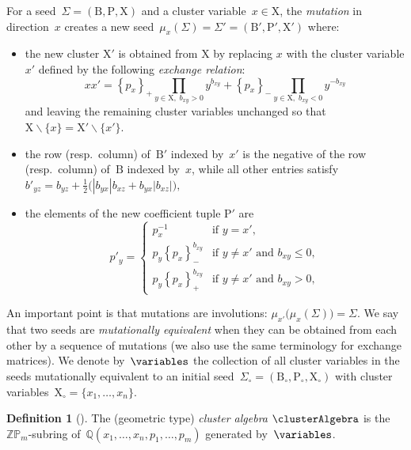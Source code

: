 \documentclass{amsart}
\theoremstyle{definition}
\newtheorem{definition}[theorem]{Definition}
\newcommand{\Q}{\mathbb{Q}} %
\newcommand{\Z}{\mathbb{Z}} %
\newcommand{\ssm}{\smallsetminus} %
\newcommand{\darkblue}{\color{darkblue}} %
\newcommand{\defn}[1]{\textsl{\darkblue #1}} %
\newcommand{\Trop}[1]{\mathbb{P}_{#1}} %
\newcommand{\positiveExponents}[1]{\left\{#1\right\}_+} %
\newcommand{\negativeExponents}[1]{\left\{#1\right\}_-} %
\newcommand{\seed}{\Sigma} %
\newcommand{\cluster}{\mathrm{X}} %
\newcommand{\coefficients}{\mathrm{P}} %
\newcommand{\B}{\mathrm{B}} %
\begin{document}
For a seed~$\seed = (\B, \coefficients, \cluster)$ and a cluster variable~$x \in \cluster$, the \defn{mutation} in direction~$x$ creates a new seed~$\mu_x(\seed) = \seed' = (\B', \coefficients', \cluster')$ where:
\begin{itemize}
\item the new cluster $\cluster'$ is obtained from $\cluster$ by replacing $x$ with the cluster variable $x'$ defined by the following \defn{exchange relation}:
\[
x x' = \positiveExponents{p_x} \prod_{{y \in \cluster, \; b_{xy}  > 0}} y^{b_{xy}} + \negativeExponents{p_x} \prod_{{y \in \cluster, \; b_{xy}  <0}} y^{-b_{xy}}
\]
and leaving the remaining cluster variables unchanged so that $\cluster \ssm \{x\} = \cluster' \ssm \{x'\}$.

\item the row (resp.~column) of~$\B'$ indexed by~$x'$ is the negative of the row (resp.~column) of~$\B$ indexed by~$x$, while all other entries satisfy
\(
b'_{yz} = b_{yz} + \frac{1}{2}\big(|b_{yx}| b_{xz} + b_{yx}|b_{xz}|\big),
\)

\item the elements of the new coefficient tuple $\coefficients'$ are 
\[
p'_y =
\begin{cases}
	p_x^{-1}  & \text{if } y = x', \\
	p_y\negativeExponents{p_x}^{b_{xy}}  & \text{if } y \neq x' \text{ and } b_{xy} \leq 0, \\
	p_y\positiveExponents{p_x}^{b_{xy}}  & \text{if } y \neq x' \text{ and } b_{xy} > 0,
\end{cases}
\]
\end{itemize}
An important point is that mutations are involutions: $\mu_{x'} \big( \mu_{x}(\seed) \big) = \seed$.
We say that two seeds are \defn{mutationally equivalent} when they can be obtained from each other by a sequence of mutations (we also use the same terminology for exchange matrices).
We denote by~$\variables$ the collection of all cluster variables in the seeds mutationally equivalent to an initial seed~$\seed_\circ = (\B_\circ, \coefficients_\circ, \cluster_\circ)$ with cluster variables~$\cluster_\circ = \{x_1, \dots, x_n\}$.

\begin{definition}[{\cite[Def.~2.11]{FominZelevinsky-ClusterAlgebrasIV}}]
The (geometric type) \defn{cluster algebra} $\clusterAlgebra$ is the $\Z\Trop{m}$-subring of~$\Q(x_1, \dots, x_n, p_1, \dots, p_m)$ generated by~$\variables$.
\end{definition}
\end{document}
